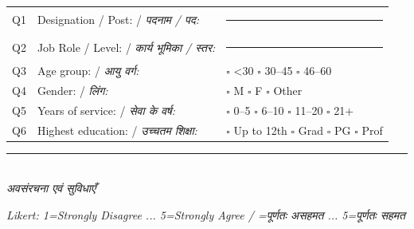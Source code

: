 \documentclass[10pt,a4paper]{article}
\newcommand{\blank}{\rule{7cm}{0.4pt}}
\begin{document}
\noindent\begin{tabularx}{\textwidth}{@{}L{0.8cm} L{7.2cm} X@{}}
Q1 & Designation / Post: / {\hindifont\small\itshape\color{black!70} पदनाम / पद:} & \blank \\[3pt]
Q2 & Job Role / Level: / {\hindifont\small\itshape\color{black!70} कार्य भूमिका / स्तर:} & \blank \\[3pt]
Q3 & Age group: / {\hindifont\small\itshape\color{black!70} आयु वर्ग:} & {\Large$\square$} <30 {\Large$\square$} 30--45 {\Large$\square$} 46--60 \\[3pt]
Q4 & Gender: / {\hindifont\small\itshape\color{black!70} लिंग:} & {\Large$\square$} M {\Large$\square$} F {\Large$\square$} Other \\[3pt]
Q5 & Years of service: / {\hindifont\small\itshape\color{black!70} सेवा के वर्ष:} & {\Large$\square$} 0--5 {\Large$\square$} 6--10 {\Large$\square$} 11--20 {\Large$\square$} 21+ \\[3pt]
Q6 & Highest education: / {\hindifont\small\itshape\color{black!70} उच्चतम शिक्षा:} & {\Large$\square$} Up to 12th {\Large$\square$} Grad {\Large$\square$} PG {\Large$\square$} Prof \\[3pt]
\end{tabularx}
\vspace{3pt}
\noindent\rule{\textwidth}{0.3pt}\vspace{3pt}
\\
{\hindifont\itshape\color{black!70} अवसंरचना एवं सुविधाएँ}\vspace{3pt}

\small\textit{Likert: 1=Strongly Disagree ... 5=Strongly Agree / {=पूर्णतः असहमत ... 5=पूर्णतः सहमत}}\vspace{3pt}
\end{document}
